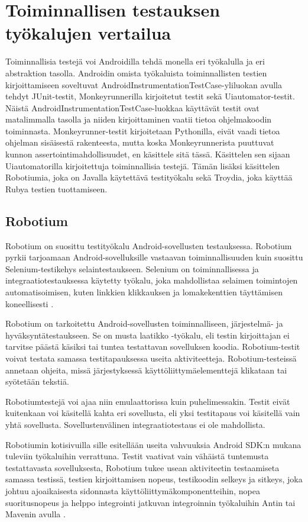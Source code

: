 \section{Toiminnallisen testauksen työkalujen vertailua}

Toiminnallisia testejä voi Androidilla tehdä monella eri työkalulla ja eri abstraktion tasolla. Androidin omista työkaluista toiminnallisten testien kirjoittamiseen soveltuvat AndroidInstrumentationTestCase-yliluokan avulla tehdyt JUnit-testit, Monkeyrunnerilla kirjoitetut testit sekä Uiautomator-testit. Näistä AndroidInstrumentationTestCase-luokkaa käyttävät testit ovat matalimmalla tasolla ja niiden kirjoittaminen vaatii tietoa ohjelmakoodin toiminnasta. Monkeyrunner-testit kirjoitetaan Pythonilla, eivät vaadi tietoa ohjelman sisäisestä rakenteesta, mutta koska Monkeyrunnerista puuttuvat kunnon assertointimahdollisuudet, en käsittele sitä tässä. Käsittelen sen sijaan Uiautomatorilla kirjoitettuja toiminnallisia testejä. Tämän lisäksi käsittelen Robotiumia, joka on Javalla käytettävä testityökalu sekä Troydia, joka käyttää Rubya testien tuottamiseen.

\subsection{Robotium}

Robotium on suosittu testityökalu Android-sovellusten testauksessa. Robotium pyrkii tarjoamaan Android-sovelluksille vastaavan toiminnallisuuden kuin suosittu Selenium-testikehys selaintestaukseen. Selenium on toiminnallisessa ja integraatiotestauksessa käytetty työkalu, joka mahdollistaa selaimen toimintojen automatisoimisen, kuten linkkien klikkauksen ja lomakekenttien täyttämisen koneellisesti \cite{selenium}.

Robotium on tarkoitettu Android-sovellusten toiminnalliseen, järjestelmä- ja hyväksyntätestaukseen. Se on musta laatikko -työkalu, eli testin kirjoittajan ei tarvitse päästä käsiksi tai tuntea testattavan sovelluksen koodia. Robotium-testit voivat testata samassa testitapauksessa useita aktiviteetteja. Robotium-testeissä annetaan ohjeita, missä järjestyksessä käyttöliittymäelementtejä klikataan tai syötetään tekstiä.

Robotiumtestejä voi ajaa niin emulaattorissa kuin puhelimessakin. Testit eivät kuitenkaan voi käsitellä kahta eri sovellusta, eli yksi testitapaus voi käsitellä vain yhtä sovellusta. Sovellustenvälinen integraatiotestaus ei ole mahdollista.

Robotiumin kotisivuilla sille esitellään useita vahvuuksia Android SDK:n mukana tuleviin työkaluihin verrattuna. Testit vaativat vain vähäistä tuntemusta testattavasta sovelluksesta, Robotium tukee usean aktiviteetin testaamiseta samassa testissä, testien kirjoittamisen nopeus, testikoodin selkeys ja sitkeys, joka johtuu ajoaikaisesta sidonnasta käyttöliittymäkomponentteihin, nopea suoritusnopeus ja helppo integrointi jatkuvan integroinnin työkaluihin Antin tai Mavenin avulla \cite{robotium}.

